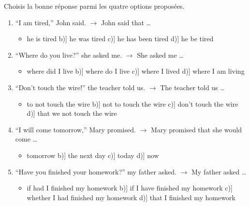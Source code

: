 \documentclass[11pt]{article}
\begin{document}
\begin{exercice}
Choisis la bonne réponse parmi les quatre options proposées.
\begin{enumerate}
\item “I am tired,” John said. $\rightarrow$ John said that \ldots
\begin{itemize}
\item[a)] he is tired \quad b)] he was tired \quad c)] he has been tired \quad d)] he be tired
\end{itemize}
\item “Where do you live?” she asked me. $\rightarrow$ She asked me \ldots
\begin{itemize}
\item[a)] where did I live \quad b)] where do I live \quad c)] where I lived \quad d)] where I am living
\end{itemize}
\item “Don't touch the wire!” the teacher told us. $\rightarrow$ The teacher told us \ldots
\begin{itemize}
\item[a)] to not touch the wire \quad b)] not to touch the wire \quad c)] don't touch the wire \quad d)] that we not touch the wire
\end{itemize}
\item “I will come tomorrow,” Mary promised. $\rightarrow$ Mary promised that she would come \ldots
\begin{itemize}
\item[a)] tomorrow \quad b)] the next day \quad c)] today \quad d)] now
\end{itemize}
\item “Have you finished your homework?” my father asked. $\rightarrow$ My father asked \ldots
\begin{itemize}
\item[a)] if had I finished my homework \quad b)] if I have finished my homework \quad c)] whether I had finished my homework \quad d)] that I finished my homework
\end{itemize}
\end{enumerate}
\end{exercice}
\end{document}
